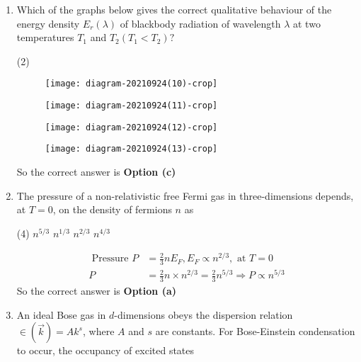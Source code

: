 \begin{enumerate}
\begin{answer}
\end{answer}
	\item Which of the graphs below gives the correct qualitative behaviour of the energy density $E_{r}(\lambda)$ of blackbody radiation of wavelength $\lambda$ at two temperatures $T_{1}$ and $T_{2}\left(T_{1}<T_{2}\right) ?$
	{}
	\begin{tasks}(2)
		\task[\textbf{a.}] \begin{figure}[H]
			\centering
			\texttt{[image: diagram-20210924(10)-crop]}
		\end{figure}
		\task[\textbf{b.}] \begin{figure}[H]
			\centering
			\texttt{[image: diagram-20210924(11)-crop]}
		\end{figure}
		\task[\textbf{c.}] \begin{figure}[H]
			\centering
			\texttt{[image: diagram-20210924(12)-crop]}
		\end{figure}
		\task[\textbf{d.}] \begin{figure}[H]
			\centering
			\texttt{[image: diagram-20210924(13)-crop]}
		\end{figure}
	\end{tasks}
\begin{answer}
	So the correct answer is \textbf{Option (c)}	
\end{answer}
	\item The pressure of a non-relativistic free Fermi gas in three-dimensions depends, at $T=0$, on the density of fermions $n$ as
	{}
	\begin{tasks}(4)
		\task[\textbf{a.}] $n^{5 / 3}$
		\task[\textbf{b.}] $n^{1 / 3}$
		\task[\textbf{c.}]  $n^{2 / 3}$
		\task[\textbf{d.}] $n^{4 / 3}$
	\end{tasks}
\begin{answer}
	\begin{align*}
	\text{	Pressure }P&=\frac{2}{3} n E_{F}, E_{F} \propto n^{2 / 3},\text{ at }T=0\\
	P&=\frac{2}{3} n \times n^{2 / 3}=\frac{2}{3} n^{5 / 3} \Rightarrow P \propto n^{5 / 3}
	\end{align*}
	So the correct answer is \textbf{Option (a)}
\end{answer}
	\item An ideal Bose gas in $d$-dimensions obeys the dispersion relation $\in(\vec{k})=A k^{s}$, where $A$ and $s$ are constants. For Bose-Einstein condensation to occur, the occupancy of excited states

\end{enumerate}
